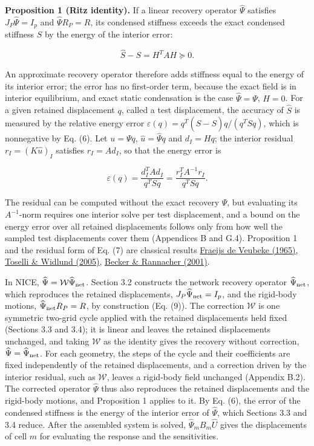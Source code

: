 \documentclass[preprint,12pt,authoryear]{elsarticle}
\begin{document}
\textbf{Proposition 1 (Ritz identity).} If a linear recovery operator \(\widehat\Psi\) satisfies \(J_P\widehat\Psi=I_p\) and \(\widehat\Psi R_P=R\), its condensed stiffness exceeds the exact condensed stiffness \(S\) by the energy of the interior error:

\[
\boxed{\widehat S-S=H^TAH\succeq0.}
\tag{6}
\]

An approximate recovery operator therefore adds stiffness equal to the energy of its interior error; the error has no first-order term, because the exact field is in interior equilibrium, and exact static condensation is the case \(\widehat\Psi=\Psi\), \(H=0\). For a given retained displacement \(q\), called a test displacement, the accuracy of \(\widehat S\) is measured by the relative energy error \(\varepsilon(q)=q^T(\widehat S-S)q/(q^TSq)\), which is nonnegative by Eq. (6). Let \(u=\Psi q\), \(\widehat u=\widehat\Psi q\) and \(d_I=Hq\); the interior residual \(r_I=(K\widehat u)_I\) satisfies \(r_I=Ad_I\), so that the energy error is

\[
\varepsilon(q)=\frac{d_I^TAd_I}{q^TSq}
=\frac{r_I^TA^{-1}r_I}{q^TSq}.
\tag{7}
\]

The residual can be computed without the exact recovery \(\Psi\), but evaluating its \(A^{-1}\)-norm requires one interior solve per test displacement, and a bound on the energy error over all retained displacements follows only from how well the sampled test displacements cover them (Appendices B and G.4). Proposition 1 and the residual form of Eq. (7) are classical results \href{https://doi.org/10.1002/nme.339}{Fraeijs de Veubeke (1965)}, \href{https://doi.org/10.1007/b137868}{Toselli \& Widlund (2005)}, \href{https://doi.org/10.1017/S0962492901000010}{Becker \& Rannacher (2001)}.

In NICE, \(\widehat\Psi=\mathcal W\widehat\Psi_{\rm net}\). Section 3.2 constructs the network recovery operator \(\widehat\Psi_{\rm net}\), which reproduces the retained displacements, \(J_P\widehat\Psi_{\rm net}=I_p\), and the rigid-body motions, \(\widehat\Psi_{\rm net}R_P=R\), by construction (Eq. (9)). The correction \(\mathcal W\) is one symmetric two-grid cycle applied with the retained displacements held fixed (Sections 3.3 and 3.4); it is linear and leaves the retained displacements unchanged, and taking \(\mathcal W\) as the identity gives the recovery without correction, \(\widehat\Psi=\widehat\Psi_{\rm net}\). For each geometry, the steps of the cycle and their coefficients are fixed independently of the retained displacements, and a correction driven by the interior residual, such as \(\mathcal W\), leaves a rigid-body field unchanged (Appendix B.2). The corrected operator \(\widehat\Psi\) thus also reproduces the retained displacements and the rigid-body motions, and Proposition 1 applies to it. By Eq. (6), the error of the condensed stiffness is the energy of the interior error of \(\widehat\Psi\), which Sections 3.3 and 3.4 reduce. After the assembled system is solved, \(\widehat\Psi_mB_m\widehat U\) gives the displacements of cell \(m\) for evaluating the response and the sensitivities.
\end{document}
